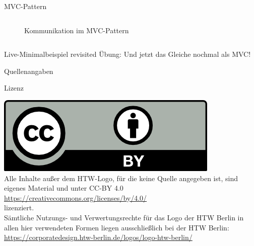\documentclass[aspectratio=169,t]{beamer}
\begin{document}
\begin{frame}{MVC-Pattern}
\begin{columns}
\begin{column}{0.5\textwidth}
\begin{figure}
                \caption{Kommunikation im MVC-Pattern \cite{MVC}}
            \end{figure}
        \end{column}
    \end{columns}
\end{frame}


\begin{frame}{Live-Minimalbeispiel revisited}
    Übung: Und jetzt das Gleiche nochmal als MVC!
\end{frame}


\begin{frame}[allowframebreaks]{Quellenangaben}
    \printbibliography
\end{frame}

\begin{frame}{Lizenz}
    \begin{center}
        \includegraphics{Bilder/by.png}\\
        Alle Inhalte außer dem HTW-Logo, für die keine Quelle angegeben ist, sind eigenes Material und unter CC-BY 4.0\\
        \url{https://creativecommons.org/licenses/by/4.0/}\\
        lizenziert.\\\vspace{0.5cm}
        Sämtliche Nutzungs- und Verwertungsrechte für das Logo der HTW Berlin in allen hier verwendeten Formen liegen ausschließlich bei der HTW Berlin:\\
        \url{https://corporatedesign.htw-berlin.de/logos/logo-htw-berlin/}
    \end{center}
\end{frame}
\end{document}
